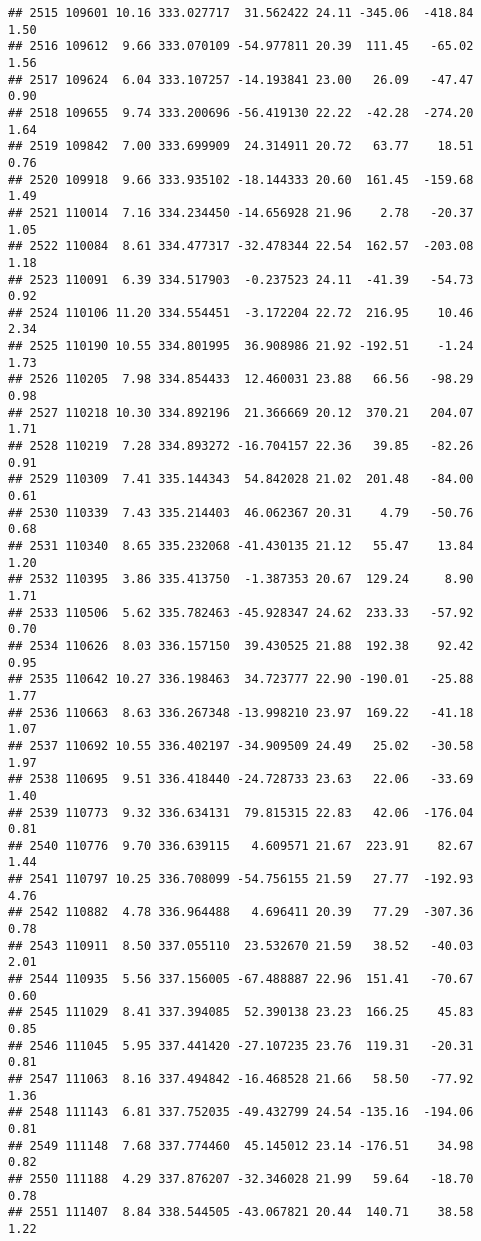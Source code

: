 \documentclass[]{article}
\begin{document}
\begin{verbatim}
## 2515 109601 10.16 333.027717  31.562422 24.11 -345.06  -418.84  1.50
## 2516 109612  9.66 333.070109 -54.977811 20.39  111.45   -65.02  1.56
## 2517 109624  6.04 333.107257 -14.193841 23.00   26.09   -47.47  0.90
## 2518 109655  9.74 333.200696 -56.419130 22.22  -42.28  -274.20  1.64
## 2519 109842  7.00 333.699909  24.314911 20.72   63.77    18.51  0.76
## 2520 109918  9.66 333.935102 -18.144333 20.60  161.45  -159.68  1.49
## 2521 110014  7.16 334.234450 -14.656928 21.96    2.78   -20.37  1.05
## 2522 110084  8.61 334.477317 -32.478344 22.54  162.57  -203.08  1.18
## 2523 110091  6.39 334.517903  -0.237523 24.11  -41.39   -54.73  0.92
## 2524 110106 11.20 334.554451  -3.172204 22.72  216.95    10.46  2.34
## 2525 110190 10.55 334.801995  36.908986 21.92 -192.51    -1.24  1.73
## 2526 110205  7.98 334.854433  12.460031 23.88   66.56   -98.29  0.98
## 2527 110218 10.30 334.892196  21.366669 20.12  370.21   204.07  1.71
## 2528 110219  7.28 334.893272 -16.704157 22.36   39.85   -82.26  0.91
## 2529 110309  7.41 335.144343  54.842028 21.02  201.48   -84.00  0.61
## 2530 110339  7.43 335.214403  46.062367 20.31    4.79   -50.76  0.68
## 2531 110340  8.65 335.232068 -41.430135 21.12   55.47    13.84  1.20
## 2532 110395  3.86 335.413750  -1.387353 20.67  129.24     8.90  1.71
## 2533 110506  5.62 335.782463 -45.928347 24.62  233.33   -57.92  0.70
## 2534 110626  8.03 336.157150  39.430525 21.88  192.38    92.42  0.95
## 2535 110642 10.27 336.198463  34.723777 22.90 -190.01   -25.88  1.77
## 2536 110663  8.63 336.267348 -13.998210 23.97  169.22   -41.18  1.07
## 2537 110692 10.55 336.402197 -34.909509 24.49   25.02   -30.58  1.97
## 2538 110695  9.51 336.418440 -24.728733 23.63   22.06   -33.69  1.40
## 2539 110773  9.32 336.634131  79.815315 22.83   42.06  -176.04  0.81
## 2540 110776  9.70 336.639115   4.609571 21.67  223.91    82.67  1.44
## 2541 110797 10.25 336.708099 -54.756155 21.59   27.77  -192.93  4.76
## 2542 110882  4.78 336.964488   4.696411 20.39   77.29  -307.36  0.78
## 2543 110911  8.50 337.055110  23.532670 21.59   38.52   -40.03  2.01
## 2544 110935  5.56 337.156005 -67.488887 22.96  151.41   -70.67  0.60
## 2545 111029  8.41 337.394085  52.390138 23.23  166.25    45.83  0.85
## 2546 111045  5.95 337.441420 -27.107235 23.76  119.31   -20.31  0.81
## 2547 111063  8.16 337.494842 -16.468528 21.66   58.50   -77.92  1.36
## 2548 111143  6.81 337.752035 -49.432799 24.54 -135.16  -194.06  0.81
## 2549 111148  7.68 337.774460  45.145012 23.14 -176.51    34.98  0.82
## 2550 111188  4.29 337.876207 -32.346028 21.99   59.64   -18.70  0.78
## 2551 111407  8.84 338.544505 -43.067821 20.44  140.71    38.58  1.22

\end{verbatim}
\end{document}
